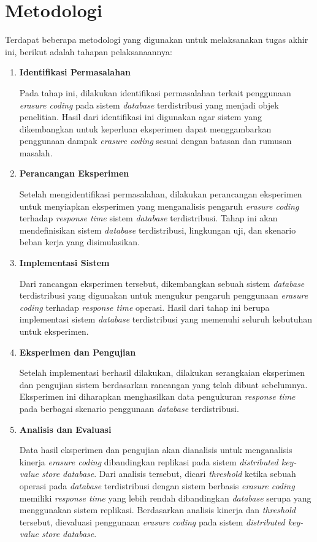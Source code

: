 \section{Metodologi}
\label{sec:metodologi}

Terdapat beberapa metodologi yang digunakan untuk melaksanakan tugas akhir ini, berikut adalah tahapan pelaksanaannya:

\begin{enumerate}
  \item \textbf{Identifikasi Permasalahan}

        Pada tahap ini, dilakukan identifikasi permasalahan terkait penggunaan \textit{erasure coding} pada sistem \textit{database} terdistribusi yang menjadi objek penelitian. Hasil dari identifikasi ini digunakan agar sistem yang dikembangkan untuk keperluan eksperimen dapat menggambarkan penggunaan dampak \textit{erasure coding} sesuai dengan batasan dan rumusan masalah.

  \item \textbf{Perancangan Eksperimen}

        Setelah mengidentifikasi permasalahan, dilakukan perancangan eksperimen untuk menyiapkan eksperimen yang menganalisis pengaruh \textit{erasure coding} terhadap \textit{response time} sistem \textit{database} terdistribusi. Tahap ini akan mendefinisikan sistem \textit{database} terdistribusi, lingkungan uji, dan skenario beban kerja yang disimulasikan.

  \item \textbf{Implementasi Sistem}

        Dari rancangan eksperimen tersebut, dikembangkan sebuah sistem \textit{database} terdistribusi yang digunakan untuk mengukur pengaruh penggunaan \textit{erasure coding} terhadap \textit{response time} operasi. Hasil dari tahap ini berupa implementasi sistem \textit{database} terdistribusi yang memenuhi seluruh kebutuhan untuk eksperimen.

\item \textbf{Eksperimen dan Pengujian}

        Setelah implementasi berhasil dilakukan, dilakukan serangkaian eksperimen dan pengujian sistem berdasarkan rancangan yang telah dibuat sebelumnya. Eksperimen ini diharapkan menghasilkan data pengukuran \textit{response time} pada berbagai skenario penggunaan \textit{database} terdistribusi.

\item \textbf{Analisis dan Evaluasi}

        Data hasil eksperimen dan pengujian akan dianalisis untuk menganalisis kinerja \textit{erasure coding} dibandingkan replikasi pada sistem \textit{distributed key-value store database}. Dari analisis tersebut, dicari \textit{threshold} ketika sebuah operasi pada \textit{database} terdistribusi dengan sistem berbasis \textit{erasure coding} memiliki \textit{response time} yang lebih rendah dibandingkan \textit{database} serupa yang menggunakan sistem replikasi. Berdasarkan analisis kinerja dan \textit{threshold} tersebut, dievaluasi penggunaan \textit{erasure coding} pada sistem \textit{distributed key-value store database}.

\end{enumerate}
